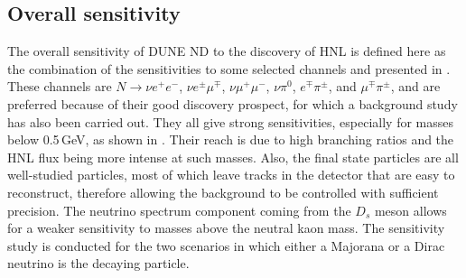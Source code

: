 \subsection{Overall sensitivity}

The overall sensitivity of DUNE ND to the discovery of HNL is defined here as the combination of the sensitivities %
to some selected channels and presented in .
These channels are $N \to \nu e^+ e^-$, $\nu e^\pm \mu^\mp$, $\nu \mu^+\mu^-$, $\nu\pi^0$, $e^\mp\pi^\pm$, and $\mu^\mp\pi^\pm$, %
and are preferred because of their good discovery prospect, for which a background study has also been carried out.
They all give strong sensitivities, especially for masses below 0.5\,GeV, as shown in .
Their reach is due to high branching ratios and the HNL flux being more intense at such masses.
Also, the final state particles are all well-studied particles, most of which leave tracks in the detector %
that are easy to reconstruct, therefore allowing the background to be controlled with sufficient precision.
The neutrino spectrum component coming from the $D_s$ meson allows for a weaker sensitivity %
to masses above the neutral kaon mass.
The sensitivity study is conducted for the two scenarios in which either a Majorana or a Dirac neutrino is the decaying particle.


